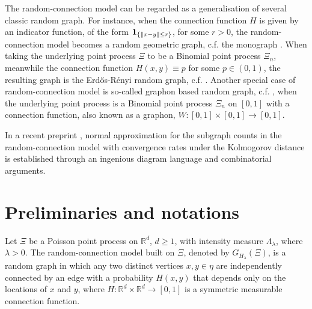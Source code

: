 \documentclass[12pt]{article}
\newcommand{\R}{\mathbb{R}}
\newcommand{\bone}{{\bf 1}}
\numberwithin{equation}{section}
\begin{document}
The random-connection model can be regarded as a generalisation of several classic random graph. For instance, when the connection function $H$ is given by an indicator function, of the form $\bone_{\{\|x-y\|\le r\}}$, for some $r>0$, the random-connection model becomes a random geometric graph, c.f. the monograph \cite{penrosebk}. When taking the underlying point process $\Xi$ to be a Binomial point process $\Xi_n$, meanwhile the connection function $H(x,y)\equiv p$ for some $p\in(0,1)$, the resulting graph is the Erd{\H o}s-R\'enyi random graph, c.f. \cite{gilbert59,ER}. Another special case of random-connection model is so-called graphon based random graph, c.f. \cite{zhang22,bhattacharya23}, when the underlying point process is a Binomial point process $\Xi_n$ on $[0,1]$ with a connection function, also known as a graphon, $W:[0,1]\times[0,1]\to[0,1]$.

In a recent preprint \cite{LiuPrivault23}, normal approximation for the subgraph counts in the random-connection model with convergence rates under the Kolmogorov distance is established through an ingenious diagram language and combinatorial arguments. 
 

\section{Preliminaries and notations}
\noindent
Let $\Xi$ be a Poisson point process on $\R^d$, $d\geq 1$, with intensity measure $\Lambda_\lambda$, where $\lambda > 0$. The random-connection model built on $\Xi$, denoted by $G_{H_\lambda}(\Xi )$, is a random graph in which any two distinct vertices $x,y\in\eta$ are independently connected by an edge with a probability $H(x,y)$ that depends only on the locations of $x$ and $y$, where $H:\R^d\times \R^d\to[0,1]$ is a symmetric measurable connection function. 
\end{document}
